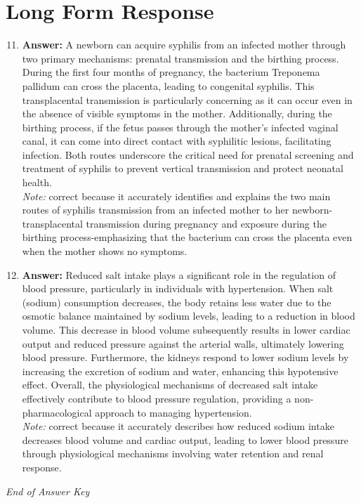 \documentclass[12pt]{article}
\begin{document}
\section*{Long Form Response}
\begin{enumerate}[label=\arabic*.]
\setcounter{enumi}{10}
\item \textbf{Answer:} A newborn can acquire syphilis from an infected mother through two primary mechanisms: prenatal transmission and the birthing process. During the first four months of pregnancy, the bacterium Treponema pallidum can cross the placenta, leading to congenital syphilis. This transplacental transmission is particularly concerning as it can occur even in the absence of visible symptoms in the mother. Additionally, during the birthing process, if the fetus passes through the mother's infected vaginal canal, it can come into direct contact with syphilitic lesions, facilitating infection. Both routes underscore the critical need for prenatal screening and treatment of syphilis to prevent vertical transmission and protect neonatal health.
\\ \textit{Note:} correct because it accurately identifies and explains the two main routes of syphilis transmission from an infected mother to her newborn-transplacental transmission during pregnancy and exposure during the birthing process-emphasizing that the bacterium can cross the placenta even when the mother shows no symptoms.
\item \textbf{Answer:} Reduced salt intake plays a significant role in the regulation of blood pressure, particularly in individuals with hypertension. When salt (sodium) consumption decreases, the body retains less water due to the osmotic balance maintained by sodium levels, leading to a reduction in blood volume. This decrease in blood volume subsequently results in lower cardiac output and reduced pressure against the arterial walls, ultimately lowering blood pressure. Furthermore, the kidneys respond to lower sodium levels by increasing the excretion of sodium and water, enhancing this hypotensive effect. Overall, the physiological mechanisms of decreased salt intake effectively contribute to blood pressure regulation, providing a non-pharmacological approach to managing hypertension.
\\ \textit{Note:} correct because it accurately describes how reduced sodium intake decreases blood volume and cardiac output, leading to lower blood pressure through physiological mechanisms involving water retention and renal response.
\end{enumerate}

\vfill
\noindent\textit{End of Answer Key}
\end{document}
